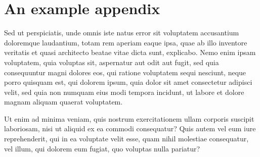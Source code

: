 \chapter{An example appendix}

Sed ut perspiciatis, unde omnis iste natus error sit voluptatem accusantium
doloremque laudantium, totam rem aperiam eaque ipsa, quae ab illo inventore
veritatis et quasi architecto beatae vitae dicta sunt, explicabo. Nemo enim
ipsam voluptatem, quia voluptas sit, aspernatur aut odit aut fugit, sed quia
consequuntur magni dolores eos, qui ratione voluptatem sequi nesciunt, neque
porro quisquam est, qui dolorem ipsum, quia dolor sit amet consectetur adipisci
velit, sed quia non numquam eius modi tempora incidunt, ut labore et dolore
magnam aliquam quaerat voluptatem.

Ut enim ad minima veniam, quis nostrum exercitationem ullam corporis suscipit
laboriosam, nisi ut aliquid ex ea commodi consequatur? Quis autem vel eum iure
reprehenderit, qui in ea voluptate velit esse, quam nihil molestiae
consequatur, vel illum, qui dolorem eum fugiat, quo voluptas nulla pariatur?
